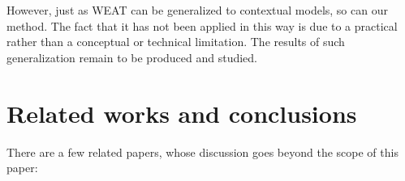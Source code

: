 \documentclass{clv3}
\begin{document}
However, just as WEAT can be generalized to contextual models, so can our method. The fact that it has not been applied in this way is due to a practical rather than a conceptual or technical limitation. The results of such generalization remain to be produced and studied.





\hypertarget{related-works-and-conclusions}{%
\section{Related works and
conclusions}\label{related-works-and-conclusions}}

\label{sec:related}

There are a few related papers, whose discussion goes beyond the scope
of this paper:
\end{document}
